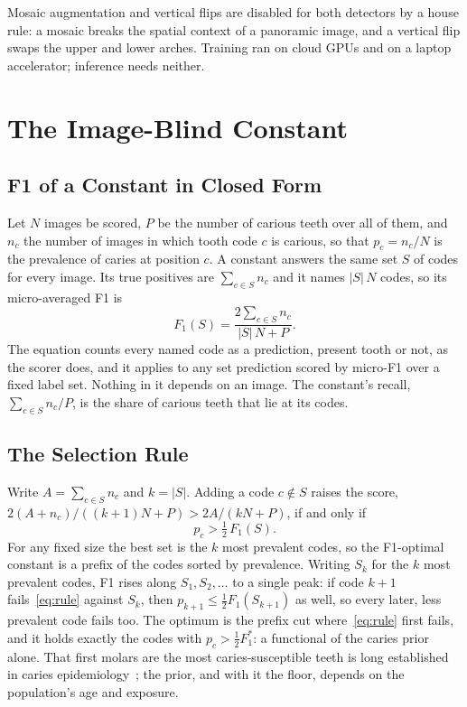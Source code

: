 Mosaic augmentation and vertical flips are disabled for both detectors by a house rule: a mosaic
breaks the spatial context of a panoramic image, and a vertical flip swaps the upper and lower arches.
Training ran on cloud GPUs and on a laptop accelerator; inference needs neither. %

\section{The Image-Blind Constant}
\label{sec:method-constant}

\subsection{F1 of a Constant in Closed Form}

Let $N$ images be scored, $P$ be the number of carious teeth over all of them, and $n_c$ the number of
images in which tooth code $c$ is carious, so that $p_c = n_c/N$ is the prevalence of caries at
position $c$. A constant answers the same set $S$ of codes for every image. Its true positives are
$\sum_{c \in S} n_c$ and it names $|S|\,N$ codes, so its micro-averaged F1 is
\begin{equation}
F_1(S) = \frac{2 \sum_{c \in S} n_c}{|S|\,N + P}.
\label{eq:constf1}
\end{equation}
The equation counts every named code as a prediction, present tooth or not, as the scorer does, and
it applies to any set prediction scored by micro-F1 over a fixed label set. Nothing in it depends on an
image. The constant's recall, $\sum_{c \in S} n_c / P$, is the share of carious teeth that lie at its
codes.

\subsection{The Selection Rule}

Write $A = \sum_{c \in S} n_c$ and $k = |S|$. Adding a code $c \notin S$ raises the score,
$2(A+n_c)/((k+1)N+P) > 2A/(kN+P)$, if and only if
\begin{equation}
p_c > \tfrac{1}{2}\, F_1(S).
\label{eq:rule}
\end{equation}
For any fixed size the best set is the $k$ most prevalent codes, so the F1-optimal constant is a
prefix of the codes sorted by prevalence. Writing $S_k$ for the $k$ most prevalent codes, F1 rises
along $S_1, S_2, \dots$ to a single peak: if code $k+1$ fails~\eqref{eq:rule} against $S_k$, then
$p_{k+1} \le \tfrac{1}{2}F_1(S_{k+1})$ as well, so every later, less prevalent code fails too. The
optimum is the prefix cut where~\eqref{eq:rule} first fails, and it holds exactly the codes with
$p_c > \tfrac{1}{2}F_1^{*}$: a functional of the caries prior alone. That first molars are the most
caries-susceptible teeth is long established in caries epidemiology~\cite{batchelor2004grouping}; the
prior, and with it the floor, depends on the population's age and exposure. %

